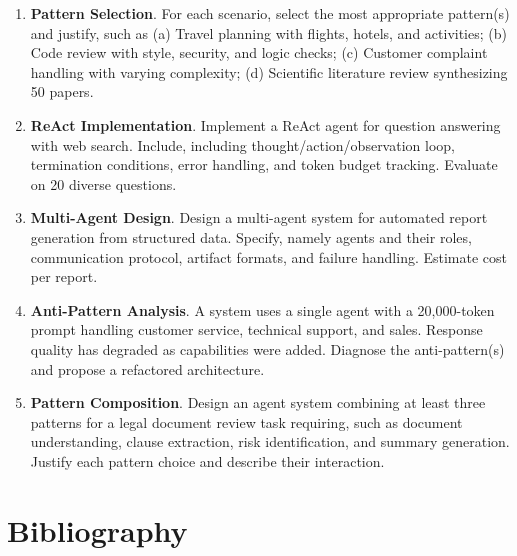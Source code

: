 \begin{enumerate}
\item \textbf{Pattern Selection}. For each scenario, select the most appropriate pattern(s) and justify, such as (a) Travel planning with flights, hotels, and activities; (b) Code review with style, security, and logic checks; (c) Customer complaint handling with varying complexity; (d) Scientific literature review synthesizing 50 papers.

\item \textbf{ReAct Implementation}. Implement a ReAct agent for question answering with web search. Include, including thought/action/observation loop, termination conditions, error handling, and token budget tracking. Evaluate on 20 diverse questions.

\item \textbf{Multi-Agent Design}. Design a multi-agent system for automated report generation from structured data. Specify, namely agents and their roles, communication protocol, artifact formats, and failure handling. Estimate cost per report.

\item \textbf{Anti-Pattern Analysis}. A system uses a single agent with a 20,000-token prompt handling customer service, technical support, and sales. Response quality has degraded as capabilities were added. Diagnose the anti-pattern(s) and propose a refactored architecture.

\item \textbf{Pattern Composition}. Design an agent system combining at least three patterns for a legal document review task requiring, such as document understanding, clause extraction, risk identification, and summary generation. Justify each pattern choice and describe their interaction.
\end{enumerate}

\section*{Bibliography}

